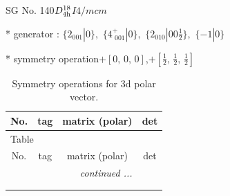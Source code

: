 \documentclass[fleqn,8pt]{jsarticle}
\begin{document}
\setcounter{MaxMatrixCols}{32}

\renewcommand{\tablename}{Table~}
\renewcommand{\figurename}{Figure~}
\begin{center}
\LARGE
SG No. 140\quad$D_{\rm 4h}^{18}$\quad$I4/mcm$\quad[ tetragonal ]
\end{center}

* generator : $\{2{}_{001}|0\},\,\,\{4^{+}_{\,\,001}|0\},\,\,\{2{}_{010}|0 0 \frac{1}{2}\},\,\,\{-1|0\}$

* symmetry operation\quad$+\left[ 0,\, 0,\, 0 \right]$,\quad $+\left[ \frac{1}{2},\, \frac{1}{2},\, \frac{1}{2} \right]$
\renewcommand{\arraystretch}{1.3}
\begin{longtable}{cccc}
\caption{Symmetry operations for 3d polar vector.}
 \\
 \hline \hline
No. & tag & matrix (polar) & det \\ \hline \endfirsthead

\multicolumn{3}{l}{\tablename\ \thetable{}} \\
 \hline \hline
No. & tag & matrix (polar) & det \\ \hline \endhead

 \hline \hline
\multicolumn{3}{r}{\footnotesize\it continued ...} \\ \endfoot

 \hline \hline
\multicolumn{3}{r}{} \\ \endlastfoot


\end{longtable}
\end{document}
